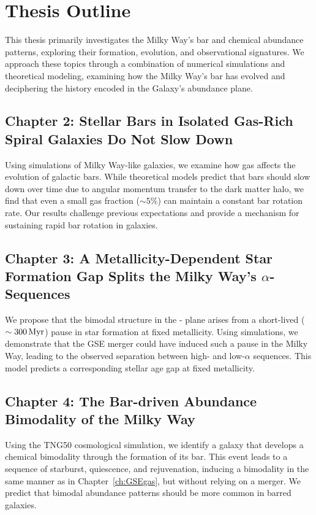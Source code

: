 \section{Thesis Outline}
\label{sec:thesis_outline}
This thesis primarily investigates the Milky Way's bar and chemical abundance patterns, exploring their formation, evolution, and observational signatures. We approach these topics through a combination of numerical simulations and theoretical modeling, examining how the Milky Way's bar has evolved and deciphering the history encoded in the Galaxy's abundance plane.

\subsection*{Chapter 2: Stellar Bars in Isolated Gas-Rich Spiral Galaxies Do Not Slow Down}
Using simulations of Milky Way-like galaxies, we examine how gas affects the evolution of galactic bars. While theoretical models predict that bars should slow down over time due to angular momentum transfer to the dark matter halo, we find that even a small gas fraction ($\sim5\%$) can maintain a constant bar rotation rate. Our results challenge previous expectations and provide a mechanism for sustaining rapid bar rotation in galaxies.

\subsection*{Chapter 3: A Metallicity-Dependent Star Formation Gap Splits the Milky Way's $\alpha$-Sequences}
We propose that the bimodal structure in the \alphaFe{}-\FeH{} plane arises from a short-lived ($\sim300\,\textrm{Myr}$) pause in star formation at fixed metallicity. Using simulations, we demonstrate that the GSE merger could have induced such a pause in the Milky Way, leading to the observed separation between high- and low-$\alpha$ sequences. This model predicts a corresponding stellar age gap at fixed metallicity.

\subsection*{Chapter 4: The Bar-driven Abundance Bimodality of the Milky Way}
Using the TNG50 cosmological simulation, we identify a galaxy that develops a chemical bimodality through the formation of its bar. This event leads to a sequence of starburst, quiescence, and rejuvenation, inducing a bimodality in the same manner as in Chapter~\ref{ch:GSEgas}, but without relying on a merger. We predict that bimodal abundance patterns should be more common in barred galaxies.